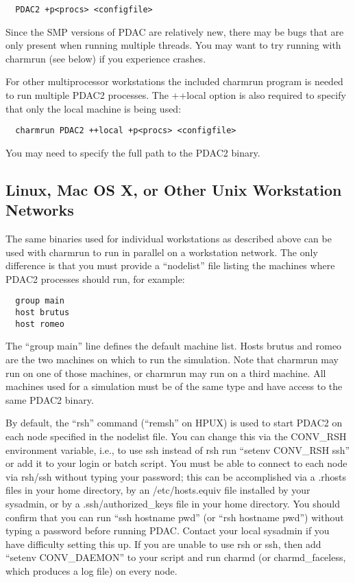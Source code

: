 \begin{verbatim}
  PDAC2 +p<procs> <configfile>
\end{verbatim}

Since the SMP versions of PDAC are relatively new, there may be bugs
that are only present when running multiple threads.  You may want to
try running with charmrun (see below) if you experience crashes.

For other multiprocessor workstations the included charmrun program is
needed to run multiple PDAC2 processes.  The ++local option is also
required to specify that only the local machine is being used:

\begin{verbatim}
  charmrun PDAC2 ++local +p<procs> <configfile>
\end{verbatim}

You may need to specify the full path to the PDAC2 binary.

\subsection{Linux, Mac OS X, or Other Unix Workstation Networks}

The same binaries used for individual workstations as described above
can be used with charmrun to run in parallel on a workstation network.
The only difference is that you must provide a ``nodelist'' file listing
the machines where PDAC2 processes should run, for example:

\begin{verbatim}
  group main
  host brutus
  host romeo
\end{verbatim}

The ``group main'' line defines the default machine list.  Hosts brutus
and romeo are the two machines on which to run the simulation.  Note
that charmrun may run on one of those machines, or charmrun may run
on a third machine.  All machines used for a simulation must be of the
same type and have access to the same PDAC2 binary.

By default, the ``rsh'' command (``remsh'' on HPUX) is used to start PDAC2
on each node specified in the nodelist file.  You can change this via
the CONV\_RSH environment variable, i.e., to use ssh instead of rsh run
``setenv CONV\_RSH ssh'' or add it to your login or batch script.  You
must be able to connect to each node via rsh/ssh without typing your
password; this can be accomplished via a .rhosts files in your home
directory, by an /etc/hosts.equiv file installed by your sysadmin, or
by a .ssh/authorized\_keys file in your home directory.  You should
confirm that you can run ``ssh hostname pwd'' (or ``rsh hostname pwd'')
without typing a password before running PDAC.  Contact your local
sysadmin if you have difficulty setting this up.  If you are unable to
use rsh or ssh, then add ``setenv CONV\_DAEMON'' to your script and run 
charmd (or charmd\_faceless, which produces a log file) on every node.

